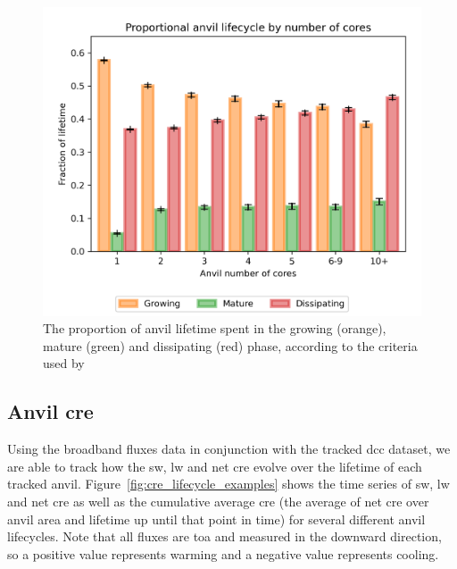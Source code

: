 \begin{figure}[tp]
    \includegraphics[width=\textwidth]{figures/chapter4_12.png}
    \caption[
    The proportion of anvil lifetime spent in the growing, mature and dissipating phase
    ]{
    The proportion of anvil lifetime spent in the growing (orange), mature (green) and dissipating (red) phase, according to the criteria used by \citet{futyan_deep_2007}
    }
    \label{fig:seviri_lifetime_proportions}
\end{figure}


\subsection{Anvil \acrshort{cre}}

Using the broadband fluxes data in conjunction with the tracked \acrshort{dcc} dataset, we are able to track how the \acrshort{sw}, \acrshort{lw} and net \acrshort{cre} evolve over the lifetime of each tracked anvil.
Figure~\ref{fig:cre_lifecycle_examples} shows the time series of \acrshort{sw}, \acrshort{lw} and net \acrshort{cre} as well as the cumulative average \acrshort{cre} (the average of net \acrshort{cre} over anvil area and lifetime up until that point in time) for several different anvil lifecycles.
Note that all fluxes are \acrshort{toa} and measured in the downward direction, so a positive value represents warming and a negative value represents cooling.


